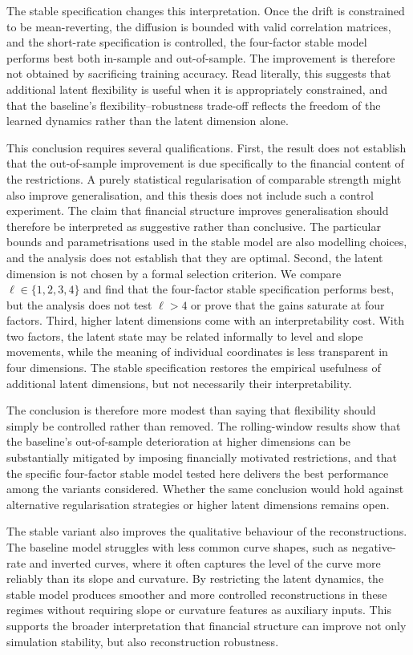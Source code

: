 The stable specification changes this interpretation. Once the drift is
constrained to be mean-reverting, the diffusion is bounded with valid
correlation matrices, and the short-rate specification is controlled, the
four-factor stable model performs best both in-sample and out-of-sample. The
improvement is therefore not obtained by sacrificing training accuracy. Read
literally, this suggests that additional latent flexibility is useful when it is
appropriately constrained, and that the baseline's flexibility--robustness
trade-off reflects the freedom of the learned dynamics rather than the latent
dimension alone.

This conclusion requires several qualifications. First, the result does not
establish that the out-of-sample improvement is due specifically to the
financial content of the restrictions. A purely statistical regularisation of
comparable strength might also improve generalisation, and this thesis does not
include such a control experiment. The claim that financial structure improves
generalisation should therefore be interpreted as suggestive rather than
conclusive. The particular bounds and parametrisations used in the stable model
are also modelling choices, and the analysis does not establish that they are
optimal. Second, the latent dimension is not chosen by a formal selection
criterion. We compare \(\ell\in\{1,2,3,4\}\) and find that the four-factor
stable specification performs best, but the analysis does not test
\(\ell>4\) or prove that the gains saturate at four factors. Third, higher
latent dimensions come with an interpretability cost. With two factors, the
latent state may be related informally to level and slope movements, while the
meaning of individual coordinates is less transparent in four dimensions. The
stable specification restores the empirical usefulness of additional latent
dimensions, but not necessarily their interpretability.

The conclusion is therefore more modest than saying that flexibility should
simply be controlled rather than removed. The rolling-window results show that
the baseline's out-of-sample deterioration at higher dimensions can be
substantially mitigated by imposing financially motivated restrictions, and
that the specific four-factor stable model tested here delivers the best
performance among the variants considered. Whether the same conclusion would
hold against alternative regularisation strategies or higher latent dimensions
remains open.

The stable variant also improves the qualitative behaviour of the reconstructions. The baseline model struggles with less common curve shapes, such as negative-rate and inverted curves, where it often captures the level of the curve more reliably than its slope and curvature. By restricting the latent dynamics, the stable model produces smoother and more controlled reconstructions in these regimes without requiring slope or curvature features as auxiliary inputs. This supports the broader interpretation that financial structure can improve not only simulation stability, but also reconstruction robustness.

